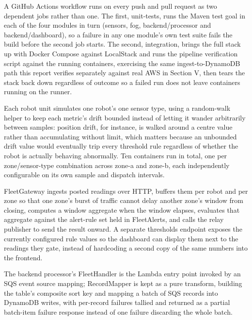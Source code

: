 \documentclass[conference]{IEEEtran}
\begin{document}
A GitHub Actions workflow runs on every push and pull request as two dependent jobs rather than one. The first, unit-tests, runs the Maven test goal in each of the four modules in turn (sensors, fog, backend/processor and backend/dashboard), so a failure in any one module's own test suite fails the build before the second job starts. The second, integration, brings the full stack up with Docker Compose against LocalStack and runs the pipeline verification script against the running containers, exercising the same ingest-to-DynamoDB path this report verifies separately against real AWS in Section V, then tears the stack back down regardless of outcome so a failed run does not leave containers running on the runner.

Each robot unit simulates one robot's one sensor type, using a random-walk helper to keep each metric's drift bounded instead of letting it wander arbitrarily between samples: position drift, for instance, is walked around a centre value rather than accumulating without limit, which matters because an unbounded drift value would eventually trip every threshold rule regardless of whether the robot is actually behaving abnormally. Ten containers run in total, one per zone/sensor-type combination across zone-a and zone-b, each independently configurable on its own sample and dispatch intervals.

FleetGateway ingests posted readings over HTTP, buffers them per robot and per zone so that one zone's burst of traffic cannot delay another zone's window from closing, computes a window aggregate when the window elapses, evaluates that aggregate against the alert-rule set held in FleetAlerts, and calls the relay publisher to send the result onward. A separate thresholds endpoint exposes the currently configured rule values so the dashboard can display them next to the readings they gate, instead of hardcoding a second copy of the same numbers into the frontend.

The backend processor's FleetHandler is the Lambda entry point invoked by an SQS event source mapping; RecordMapper is kept as a pure transform, building the table's composite sort key and mapping a batch of SQS records into DynamoDB writes, with per-record failures tallied and returned as a partial batch-item failure response instead of one failure discarding the whole batch.
\end{document}
